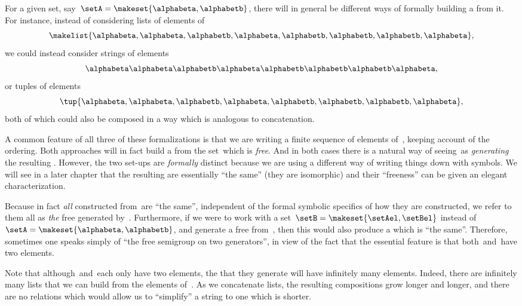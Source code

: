 For a given set, say~$\setA = \makeset{ \alphabeta, \alphabetb}$, there will in general be different ways of formally building a  from it.
For instance, instead of considering lists of elements of~\setA
\begin{equation}
    \makelist{\alphabeta,\alphabeta, \alphabetb, \alphabeta, \alphabetb, \alphabetb, \alphabetb, \alphabeta},
\end{equation}
we could instead consider strings of elements
\begin{equation}
    \alphabeta\alphabeta \alphabetb \alphabeta \alphabetb \alphabetb \alphabetb \alphabeta,
\end{equation}
or tuples of elements
\begin{equation}
    \tup{\alphabeta, \alphabeta, \alphabetb, \alphabeta, \alphabetb, \alphabetb, \alphabetb, \alphabeta},
\end{equation}
both of which could also be composed in a way which is analogous to concatenation.

A common feature of all three of these formalizations is that we are writing a finite sequence of elements of~\setA, keeping account of the ordering.
Both approaches will in fact build a  from the set~\setA which is \emph{free}.
And in both cases there is a natural way of seeing~\setA as \emph{generating} the resulting .
However, the two set-ups are \emph{formally} distinct because we are using a different way of writing things down with symbols.
We will see in a later chapter that the resulting  are essentially ``the same'' (they are isomorphic) and their ``freeness'' can be given an elegant characterization.

Because in fact \emph{all}  constructed from~\setA are ``the same'', independent of the formal symbolic specifics of how they are constructed, we refer to them all as \emph{the} free  generated by~\setA.
Furthermore, if we were to work with a set~$\setB = \makeset{ \setAel, \setBel }$ instead of~$\setA = \makeset{ \alphabeta, \alphabetb}$, and generate a free  from~\setB, then this would also produce a  which is ``the same''.
Therefore, sometimes one speaks simply of ``the free semigroup on two generators'', in view of the fact that the essential feature is that both~\setA and~\setB have two elements.

Note that although~\setA and~\setB each only have two elements, the  that they generate will have infinitely many elements.
Indeed, there are infinitely many lists that we can build from the elements of~\setA.
As we concatenate lists, the resulting compositions grow longer and longer, and there are no relations which would allow us to ``simplify'' a string to one which is shorter.

